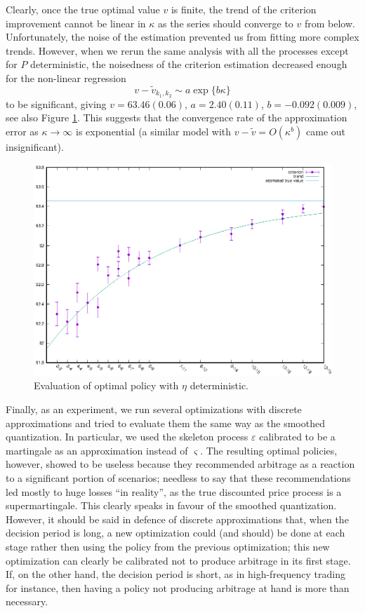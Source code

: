 \documentclass{article}              %
\begin{document}
Clearly, once the true optimal value $v$ is finite, the trend of the criterion improvement
cannot be linear in $\kappa$ as the series should converge
to $v$ from below. Unfortunately, the noise of the estimation
prevented us from fitting more complex trends. However, when we rerun
the same analysis with all the processes except for $P$
deterministic, the noisedness of the criterion estimation decreased enough for the non-linear regression
\[
v-\tilde{v}_{k_1,k_2}\sim a\exp\{b\kappa\}
\]
to be significant, giving $v=63.46(0.06)$, $a=2.40(0.11)$, $b=-0.092(0.009)$, see also Figure \ref{fig:mcvs0}. This suggests that the convergence
rate of the approximation error as $\kappa\rightarrow \infty$ is exponential (a similar model with
$v-\tilde{v}=O(\kappa^{b})$ came out insignificant). 

\begin{figure}
\begin{center}
\includegraphics{mcvs0}
\caption{Evaluation of optimal policy with $\eta$ deterministic.}
\label{fig:mcvs0}
\end{center}
\end{figure}


Finally, as an experiment, we run several optimizations with discrete
approximations and tried to evaluate them the same way as the smoothed
quantization. In particular, we used the skeleton process $\varepsilon$
calibrated to be a martingale as an approximation instead of $\varsigma$.
The resulting optimal policies, however, showed to be useless because they recommended
arbitrage as a reaction to a significant portion of scenarios; needless
to say that these recommendations led mostly to huge losses ``in reality'', as the true
discounted price process is a supermartingale. This clearly speaks
in favour of the smoothed quantization. However, it should be said in
defence of discrete approximations that, when the decision period
is long, a new optimization could (and should) be done at each stage
rather then using the policy from the previous optimization; this
new optimization can clearly be calibrated not to produce arbitrage in its first stage. If, on the other hand, the decision period is
short, as in high-frequency trading for instance, then
having a policy not producing arbitrage at hand is more than necessary.
\end{document}
